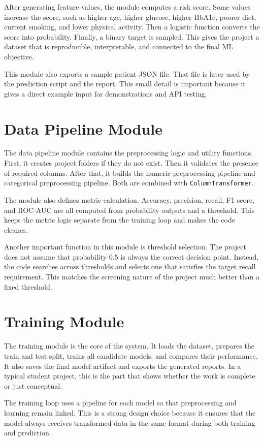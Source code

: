 \documentclass[12pt,a4paper,openany]{report}
\begin{document}
    After generating feature values, the module computes a risk score. Some values increase the score, such as higher age, higher glucose, higher HbA1c, poorer diet, current smoking, and lower physical activity. Then a logistic function converts the score into probability. Finally, a binary target is sampled. This gives the project a dataset that is reproducible, interpretable, and connected to the final ML objective.

    This module also exports a sample patient JSON file. That file is later used by the prediction script and the report. This small detail is important because it gives a direct example input for demonstrations and API testing.

    \section{Data Pipeline Module}
    The data pipeline module contains the preprocessing logic and utility functions. First, it creates project folders if they do not exist. Then it validates the presence of required columns. After that, it builds the numeric preprocessing pipeline and categorical preprocessing pipeline. Both are combined with \texttt{ColumnTransformer}.

    The module also defines metric calculation. Accuracy, precision, recall, F1 score, and ROC-AUC are all computed from probability outputs and a threshold. This keeps the metric logic separate from the training loop and makes the code cleaner.

    Another important function in this module is threshold selection. The project does not assume that probability 0.5 is always the correct decision point. Instead, the code searches across thresholds and selects one that satisfies the target recall requirement. This matches the screening nature of the project much better than a fixed threshold.

    \section{Training Module}
    The training module is the core of the system. It loads the dataset, prepares the train and test split, trains all candidate models, and compares their performance. It also saves the final model artifact and exports the generated reports. In a typical student project, this is the part that shows whether the work is complete or just conceptual.

    The training loop uses a pipeline for each model so that preprocessing and learning remain linked. This is a strong design choice because it ensures that the model always receives transformed data in the same format during both training and prediction.
\end{document}
